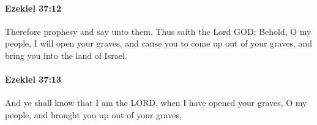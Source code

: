 		\paragraph{Ezekiel 37:12} %
			\label{EZEKIEL-37-12}

			Therefore prophesy and say unto them, Thus saith the Lord GOD; Behold, O my people, I will open your graves, and cause you to come up out of your graves, and bring you into the land of Israel.


		\paragraph{Ezekiel 37:13} %
			\label{EZEKIEL-37-13}

			And ye shall know that I am the LORD, when I have opened your graves, O my people, and brought you up out of your graves,


